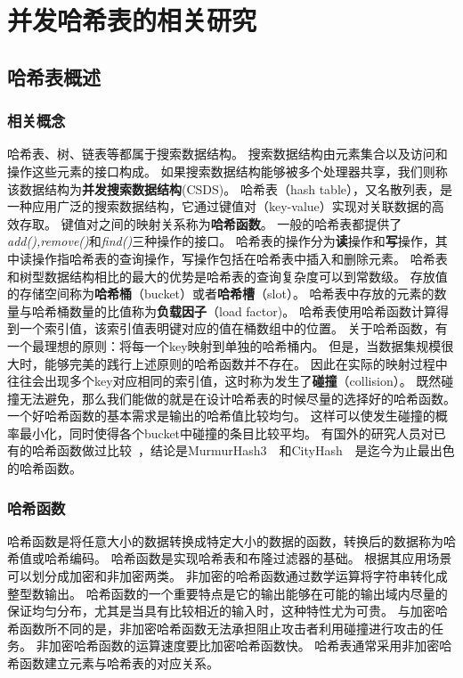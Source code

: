 \chapter{并发哈希表的相关研究}


\section{哈希表概述}

\subsection{相关概念}

哈希表、树、链表等都属于搜索数据结构。
搜索数据结构由元素集合以及访问和操作这些元素的接口构成。
如果搜索数据结构能够被多个处理器共享，我们则称该数据结构为\textbf{并发搜索数据结构}(CSDS)。
哈希表（hash table），又名散列表，是一种应用广泛的搜索数据结构，它通过键值对（key-value）实现对关联数据的高效存取。
键值对之间的映射关系称为\textbf{哈希函数}。
一般的哈希表都提供了\textit{add(),remove()}和\textit{find()}三种操作的接口。
哈希表的操作分为\textbf{读}操作和\textbf{写}操作，其中读操作指哈希表的查询操作，写操作包括在哈希表中插入和删除元素。
哈希表和树型数据结构相比的最大的优势是哈希表的查询复杂度可以到常数级。
存放值的存储空间称为\textbf{哈希桶}（bucket）或者\textbf{哈希槽}（slot）。
哈希表中存放的元素的数量与哈希桶数量的比值称为\textbf{负载因子}（load factor)。
哈希表使用哈希函数计算得到一个索引值，该索引值表明键对应的值在桶数组中的位置。
关于哈希函数，有一个最理想的原则：将每一个key映射到单独的哈希桶内。
但是，当数据集规模很大时，能够完美的践行上述原则的哈希函数并不存在。
因此在实际的映射过程中往往会出现多个key对应相同的索引值，这时称为发生了\textbf{碰撞}（collision）。
既然碰撞无法避免，那么我们能做的就是在设计哈希表的时候尽量的选择好的哈希函数。
一个好哈希函数的基本需求是输出的哈希值比较均匀。
这样可以使发生碰撞的概率最小化，同时使得各个bucket中碰撞的条目比较平均。
有国外的研究人员对已有的哈希函数做过比较~\cite{Josh2012}，结论是MurmurHash3~\cite{Murmurhash}~和CityHash~\cite{cityhash}~是迄今为止最出色的哈希函数。

\subsection{哈希函数}
哈希函数是将任意大小的数据转换成特定大小的数据的函数，转换后的数据称为哈希值或哈希编码。
哈希函数是实现哈希表和布隆过滤器的基础。
根据其应用场景可以划分成加密和非加密两类。
非加密的哈希函数通过数学运算将字符串转化成整型数输出。
哈希函数的一个重要特点是它的输出能够在可能的输出域内尽量的保证均匀分布，尤其是当具有比较相近的输入时，这种特性尤为可贵。
与加密哈希函数所不同的是，非加密哈希函数无法承担阻止攻击者利用碰撞进行攻击的任务。
非加密哈希函数的运算速度要比加密哈希函数快。
哈希表通常采用非加密哈希函数建立元素与哈希表的对应关系。


